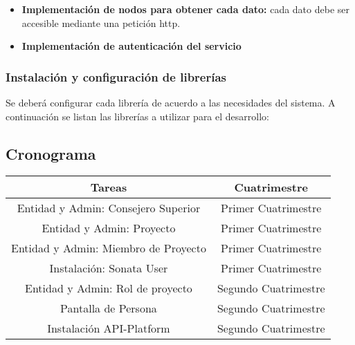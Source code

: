 \begin{itemize}
    \item \textbf{Implementación de nodos para obtener cada dato:} cada dato debe ser accesible mediante una petición http.
    \item \textbf{Implementación de autenticación del servicio}
\end{itemize}

\subsubsection{Instalación y configuración de librerías}%
\label{ssub:instalación_y_configuración_de_librerias}
Se deberá configurar cada librería de acuerdo a las necesidades del sistema.
A continuación se listan las librerías a utilizar para el desarrollo:

\begin{itemize}
    
\end{itemize}

\newpage
\subsection{Cronograma}
\label{sub:cronograma}

\begin{center}

    \begin{tabular}{| c c |}
        \hline
        Tareas & Cuatrimestre \\
        \hline
        Entidad y Admin: Consejero Superior & Primer Cuatrimestre \\
        \hline
        Entidad y Admin: Proyecto & Primer Cuatrimestre \\
        \hline
        Entidad y Admin: Miembro de Proyecto & Primer Cuatrimestre \\
        \hline
        Instalación: Sonata User & Primer Cuatrimestre  \\
        \hline
        Entidad y Admin: Rol de proyecto & Segundo Cuatrimestre \\
        \hline
        Pantalla de Persona & Segundo Cuatrimestre \\
        \hline
        Instalación API-Platform & Segundo Cuatrimestre \\
        \hline


    \end{tabular}


\end{center}
